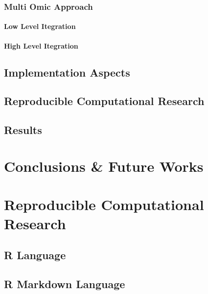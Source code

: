 \documentclass[b5paper,oneside,british,intoc,bibliograph=totoc,index=totoc,BCOR10mm,twoside,openright]{book}
\numberwithin{equation}{section}
\numberwithin{figure}{section}
\begin{document}
\subsection{Multi Omic Approach}
\subsubsection{Low Level Itegration}
\subsubsection{High Level Itegration}
\section{Implementation Aspects}
\section{Reproducible Computational Research}
\section{Results}
\chapter{Conclusions \& Future Works}

\chapter{Reproducible Computational Research}

\begin{appendices}
\section{R Language}
\section{R Markdown Language}
%
%
%
\end{appendices}

%
%
%
%
%
%

%
%
%


\printbibliography[heading=bibnumbered]
\cleardoublepage

\printglossaries

\cleardoublepage
{}
\listoffigures

\cleardoublepage
{}
\listoftables

\end{document}
